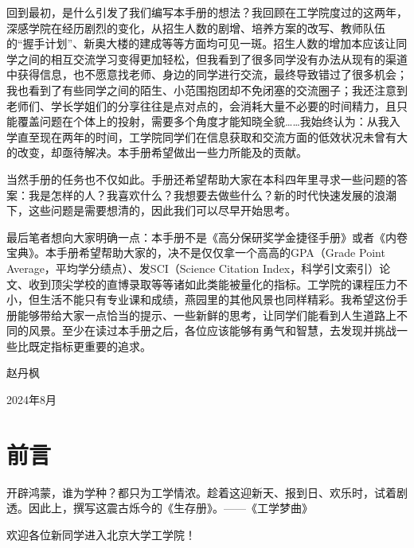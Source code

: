 \vspace{10pt}

回到最初，是什么引发了我们编写本手册的想法？我回顾在工学院度过的这两年，深感学院在经历剧烈的变化，从招生人数的剧增、培养方案的改写、教师队伍的“握手计划”、新奥大楼的建成等等方面均可见一斑。招生人数的增加本应该让同学之间的相互交流学习变得更加轻松，但我看到了很多同学没有办法从现有的渠道中获得信息，也不愿意找老师、身边的同学进行交流，最终导致错过了很多机会；我也看到了有些同学之间的陌生、小范围抱团却不免闭塞的交流圈子；我还注意到老师们、学长学姐们的分享往往是点对点的，会消耗大量不必要的时间精力，且只能覆盖问题在个体上的投射，需要多个角度才能知晓全貌……我始终认为：从我入学直至现在两年的时间，工学院同学们在信息获取和交流方面的低效状况未曾有大的改变，却亟待解决。本手册希望做出一些力所能及的贡献。

\vspace{10pt}

当然手册的任务也不仅如此。手册还希望帮助大家在本科四年里寻求一些问题的答案：我是怎样的人？我喜欢什么？我想要去做些什么？新的时代快速发展的浪潮下，这些问题是需要想清的，因此我们可以尽早开始思考。

\vspace{10pt}

最后笔者想向大家明确一点：本手册不是《高分保研奖学金捷径手册》或者《内卷宝典》。本手册希望帮助大家的，决不是仅仅拿一个高高的GPA（Grade Point Average，平均学分绩点）、发SCI（Science Citation Index，科学引文索引）论文、收到顶尖学校的直博录取等等诸如此类能被量化的指标。工学院的课程压力不小，但生活不能只有专业课和成绩，燕园里的其他风景也同样精彩。我希望这份手册能够带给大家一点恰当的提示、一些新鲜的思考，让同学们能看到人生道路上不同的风景。至少在读过本手册之后，各位应该能够有勇气和智慧，去发现并挑战一些比既定指标更重要的追求。
\begin{flushright}
	赵丹枫
	
	2024年8月
\end{flushright}

\chapter*{前言}
开辟鸿蒙，谁为学种？都只为工学情浓。趁着这迎新天、报到日、欢乐时，试着剧透。因此上，撰写这震古烁今的《生存册》。——《工学梦曲》

\vspace{10pt}

欢迎各位新同学进入北京大学工学院！

\vspace{10pt}

